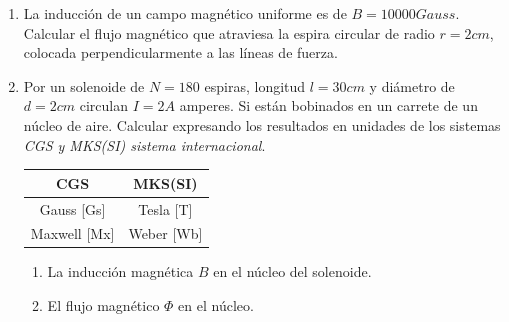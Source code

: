 \documentclass[../main]{subfiles}
\begin{document}
\begin{enumerate}
    $I=1A$. Calcular la inducción magnética $B$ en el interior del
    solenoide, y el flujo en Weber $Wb$ y Maxwell $Mx$.
  \item La inducción de un campo magnético uniforme es de
    $B=10000Gauss$. Calcular el flujo magnético que atraviesa la
    espira circular de radio $r=2cm$, colocada perpendicularmente a
    las líneas de fuerza.
  \item Por un solenoide de $N=180$ espiras, longitud $l=30cm$ y
    diámetro de $d=2cm$ circulan $I=2A$ amperes. Si están bobinados
    en un carrete de un núcleo de aire. Calcular expresando los
    resultados en unidades de los sistemas \emph{CGS y MKS(SI)
    sistema internacional}.
    \begin{center}
      \begin{tabular}{|c|c|} \hline
        CGS & MKS(SI) \\ \hline \hline
        Gauss [Gs] & Tesla [T] \\ \hline
        Maxwell [Mx] & Weber [Wb] \\ \hline
      \end{tabular}
    \end{center}
    \begin{enumerate}
      \item La inducción magnética $B$ en el núcleo del solenoide.
      \item El flujo magnético $\Phi$ en el núcleo.
    \end{enumerate}
\end{enumerate}
\end{document}
